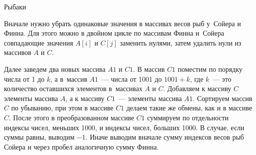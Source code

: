 \begin{tutorial}{Рыбаки}

Вначале нужно убрать одинаковые значения в массивах весов рыб у~Сойера и Финна. Для этого можно в двойном цикле по массивам Финна и~Сойера совпадающие значения $A[i]$ и $C[j]$ заменить нулями, затем удалить нули из массивов $A$ и $C$.  

Далее заведем два новых массива $A1$ и $C1$. В массив $C1$ поместим по порядку числа от 1 до $k$, а в~массив  $A1$~--- числа от 1001 до $1001+k$, где $k$~--- это количество оставшихся элементов в~массивах $A$ и $C$. Добавляем к массиву $C$ элементы массива $A$,  а к массиву $C1$~--- элементы массива $A1$. Сортируем массив $C$ по убыванию, при этом в массиве $C1$ делаем такие же обмены, как и в массиве $C$. После этого в преобразованном массиве $C1$ суммируем по отдельности индексы чисел, меньших 1000, и индексы чисел, больших 1000. В случае, если суммы равны, выводим $-1$. Иначе выводим вначале сумму индексов весов рыб Сойера и через пробел аналогичную сумму Финна.



\end{tutorial}
